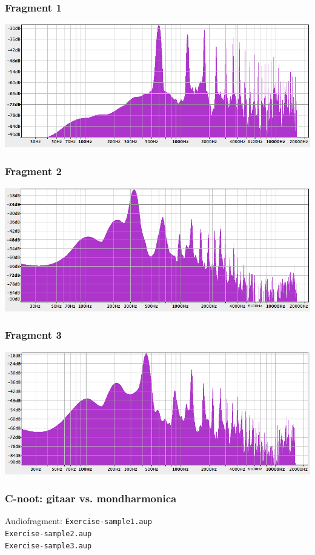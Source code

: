 \documentclass[compress, darktitle, framenumber, totalframenumber]{beamer}
\begin{document}
\begin{frame}
\frametitle{Fragment 1}
\includegraphics[width=\textwidth]{images2/Note1.png}
\end{frame}

\begin{frame}
\frametitle{Fragment 2}
\includegraphics[width=\textwidth]{images2/Note2.png}
\end{frame}

\begin{frame}
\frametitle{Fragment 3}
\includegraphics[width=\textwidth]{images2/Note3.png}
\end{frame}

\begin{frame}
\frametitle{C-noot: gitaar vs. mondharmonica}
\begin{block}{Audiofragment:}
\texttt{Exercise-sample1.aup} \\
\texttt{Exercise-sample2.aup} \\
\texttt{Exercise-sample3.aup} 
\end{block}
\end{frame}
\end{document}
